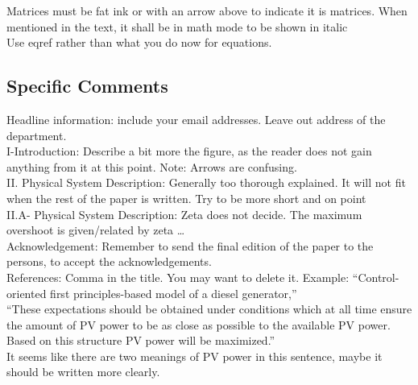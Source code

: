 \noindent Matrices must be fat ink or with an arrow above to indicate it is matrices.
When mentioned in the text, it shall be in math mode to be shown in italic \\

\noindent Use eqref rather than what you do now for equations. \\

\subsection{Specific Comments}

\noindent Headline information: include your email addresses.
Leave out address of the department. \\


\noindent I-Introduction: Describe a bit more the figure, as the reader does not gain anything from it at this point. Note: Arrows are confusing. \\


\noindent II. Physical System Description: Generally too thorough explained. It will not fit when the rest of the paper is written. Try to be more short and on point \\


\noindent II.A- Physical System Description: Zeta does not decide. The maximum overshoot is given/related by zeta … \\

\noindent Acknowledgement: Remember to send the final edition of the paper to the persons, to accept the acknowledgements.\\

\noindent References: Comma in the title. You may want to delete it. 
Example: “Control-oriented first principles-based model of a diesel generator,”\\


\noindent “These expectations should be obtained under conditions which at all time ensure the amount of PV power to be as close as possible to the available PV power. Based on this structure PV power will be maximized.” \\
It seems like there are two meanings of PV power in this sentence, maybe it should be written more clearly.


